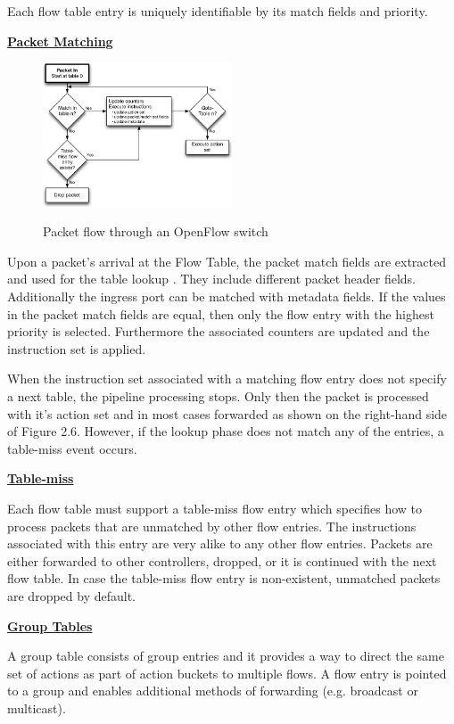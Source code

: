 Each flow table entry is uniquely identifiable by its match fields and priority. 


\underline{\textbf{Packet Matching}}

\begin{figure}[H]
\centering
\includegraphics[width=0.5\textwidth]{images/fundamentals/openflow_packet_matching.png}
\caption{Packet flow through an OpenFlow switch} \cite{ofspecification}
\end{figure}

Upon a packet's arrival at the Flow Table, the packet match fields are extracted and used for the table lookup \cite{ofspecification}. They include different packet header fields. Additionally the ingress port can be matched with metadata fields.
If the values in the packet match fields are equal, then only the flow entry with the highest priority is selected. Furthermore the associated counters are updated and the instruction set is applied.

When the instruction set associated with a matching flow entry does not specify a next table, the pipeline processing stops. Only then the packet is processed with it's action set and in most cases forwarded as shown on the right-hand side of Figure 2.6.
However, if the lookup phase does not match any of the entries, a table-miss event occurs.


\underline{\textbf{Table-miss}}

Each flow table must support a table-miss flow entry which specifies how to process packets that are unmatched by other flow entries. The instructions associated with this entry are very alike to any other flow entries. Packets are either forwarded to other controllers, dropped, or it is continued with the next flow table. In case the table-miss flow entry is non-existent, unmatched packets are dropped by default. 


\underline{\textbf{Group Tables}}

A group table consists of group entries and it provides a way to direct the same set of actions as part of action buckets to multiple flows. A flow entry is pointed to a group and enables additional methods of forwarding (e.g. broadcast or multicast).
\newpage

